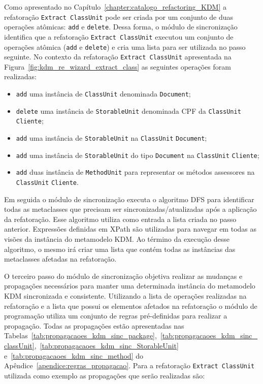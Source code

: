 Como apresentado no Capítulo~\ref{chapter:catalogo_refactoring_KDM} a refatoração \texttt{Extract ClassUnit} pode ser criada por um conjunto de duas operações atômicas: \texttt{add} e  \texttt{delete}. Dessa forma, o módulo de sincronização identifica que a refatoração \texttt{Extract ClassUnit} executou um conjunto de operações atômica (\texttt{add} e \texttt{delete}) e cria uma lista para ser utilizada no passo seguinte. No contexto da refatoração \texttt{Extract ClassUnit} apresentada na Figura~\ref{fig:kdm_re_wizard_extract_class} as seguintes operações foram realizadas: 

\begin{itemize}

\item \texttt{add} uma instância de \texttt{ClassUnit} denominada \texttt{Document};

\item \texttt{delete} uma instância de \texttt{StorableUnit} denominada CPF da \texttt{ClassUnit} \texttt{Cliente};

\item \texttt{add} uma instância de \texttt{StorableUnit} na \texttt{ClassUnit} \texttt{Document};

\item \texttt{add} uma instância de \texttt{StorableUnit} do tipo \texttt{Document} na \texttt{ClassUnit} \texttt{Cliente};

\item \texttt{add} duas instância de \texttt{MethodUnit} para representar os métodos assessores na \texttt{ClassUnit} \texttt{Cliente}.
\end{itemize}

Em seguida o módulo de sincronização executa o algoritmo DFS para identificar todas as metaclasses que precisam ser sincronizadas/atualizadas após a aplicação da refatoração. Esse algoritmo utiliza como entrada a lista criada no passo anterior. Expressões definidas em XPath são utilizadas para navegar em todas as visões da instância do metamodelo KDM. Ao término da execução desse algoritmo, o mesmo irá criar uma lista que contém todas as instâncias das metaclasses afetadas na refatoração. 
   

O terceiro passo do módulo de sincronização objetiva realizar as mudanças e propagações necessários para manter uma determinada instância do metamodelo KDM sincronizada e consistente. Utilizando a lista de operações realizadas na refatoração e a lista que possui os elementos afetados na refatoração o módulo de programação utiliza um conjunto de regras pré-definidas para realizar a propagação. Todas as propagações estão apresentadas nas Tabelas~\ref{tab:propagacaoes_kdm_sinc_package},~\ref{tab:propagacaoes_kdm_sinc_classUnit},~\ref{tab:propagacaoes_kdm_sinc_StorableUnit} e~\ref{tab:propagacaoes_kdm_sinc_method} do Apêndice~\ref{apendice:regras_propagacao}. Para a refatoração \texttt{Extract ClassUnit} utilizada como exemplo as propagações que serão realizadas são:

